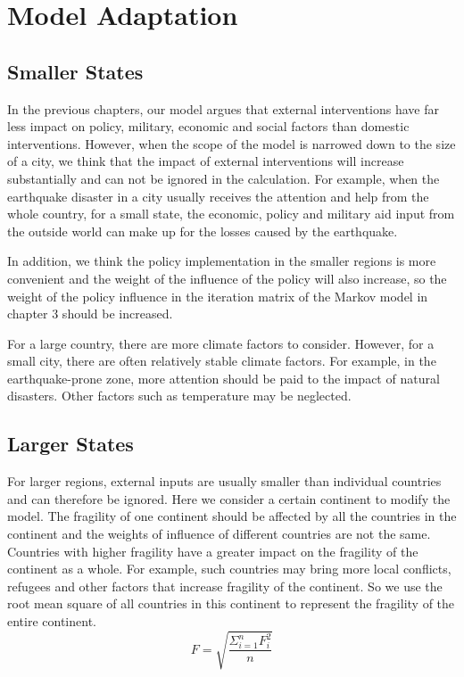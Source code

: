 \documentclass{mcmthesis}
\begin{document}
	\section{Model Adaptation}
	\subsection{Smaller States}
	In the previous chapters, our model argues that external interventions have far less impact on policy, military, economic and social factors than domestic interventions. However, when the scope of the model is narrowed down to the size of a city, we think that the impact of external interventions will increase substantially and can not be ignored in the calculation. For example, when the earthquake disaster in a city usually receives the attention and help from the whole country, for a small state, the economic, policy and military aid input from the outside world can make up for the losses caused by the earthquake.
	
	In addition, we think the policy implementation in the smaller regions is more convenient and the weight of the influence of the policy will also increase, so the weight of the policy influence in the iteration matrix of the Markov model in chapter 3 should be increased.
	
	For a large country, there are more climate factors to consider. However, for a small city, there are often relatively stable climate factors. For example, in the earthquake-prone zone, more attention should be paid to the impact of natural disasters. Other factors such as temperature may be neglected.
	
	\subsection{Larger States}
	For larger regions, external inputs are usually smaller than individual countries and can therefore be ignored. Here we consider a certain continent to modify the model. The fragility of one continent should be affected by all the countries in the continent and the weights of influence of different countries are not the same. Countries with higher fragility have a greater impact on the fragility of the continent as a whole. For example, such countries may bring more local conflicts, refugees and other factors that increase fragility of the continent. So we use the root mean square of all countries in this continent to represent the fragility of the entire continent.
	$$
	F = \sqrt{\frac{\Sigma_{i=1}^n F_i^2}{n}}
	$$
	
\end{document}
